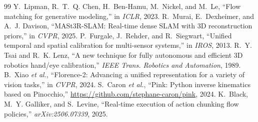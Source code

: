 \documentclass[conference,10pt]{IEEEtran}
\begin{document}
\begin{thebibliography}{99}
 Y.~Lipman, R.~T.~Q. Chen, H.~Ben-Hamu, M.~Nickel, and M.~Le, ``Flow matching for generative modeling,'' in \emph{ICLR}, 2023.
 R.~Murai, E.~Dexheimer, and A.~J. Davison, ``MASt3R-SLAM: Real-time dense SLAM with 3D reconstruction priors,'' in \emph{CVPR}, 2025.
 P.~Furgale, J.~Rehder, and R.~Siegwart, ``Unified temporal and spatial calibration for multi-sensor systems,'' in \emph{IROS}, 2013.
 R.~Y. Tsai and R.~K. Lenz, ``A new technique for fully autonomous and efficient 3D robotics hand/eye calibration,'' \emph{IEEE Trans. Robotics and Automation}, 1989.
 B.~Xiao \emph{et al.}, ``Florence-2: Advancing a unified representation for a variety of vision tasks,'' in \emph{CVPR}, 2024.
 S.~Caron \emph{et al.}, ``Pink: Python inverse kinematics based on Pinocchio,'' \url{https://github.com/stephane-caron/pink}, 2024.
 K.~Black, M.~Y. Galliker, and S.~Levine, ``Real-time execution of action chunking flow policies,'' \emph{arXiv:2506.07339}, 2025.
\end{thebibliography}
\end{document}
